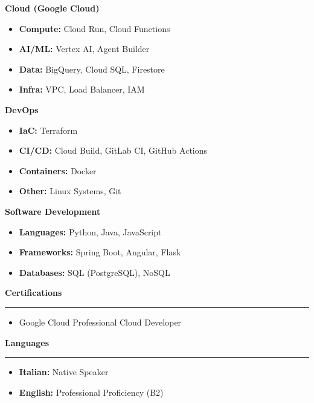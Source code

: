 \documentclass[10pt, a4paper]{article}
\newcommand{\cvsection}[1]{%
  \vspace{8pt} %
  \par %
  {\Large\bfseries\color{sectionblue}#1} %
  \par %
  \vspace{2pt} %
  \hrule %
  \vspace{6pt} %
}
\begin{document}
\begin{minipage}[t]{0.28\textwidth}
{\bfseries Cloud (Google Cloud)}
\begin{itemize}[leftmargin=*, nosep, itemsep=2pt]
    \item \textbf{Compute:} Cloud Run, Cloud Functions
    \item \textbf{AI/ML:} Vertex AI, Agent Builder
    \item \textbf{Data:} BigQuery, Cloud SQL, Firestore
    \item \textbf{Infra:} VPC, Load Balancer, IAM
\end{itemize}
\vspace{4pt}

{\bfseries DevOps}
\begin{itemize}[leftmargin=*, nosep, itemsep=2pt]
    \item \textbf{IaC:} Terraform
    \item \textbf{CI/CD:} Cloud Build, GitLab CI, GitHub Actions
    \item \textbf{Containers:} Docker
    \item \textbf{Other:} Linux Systems, Git
\end{itemize}
\vspace{4pt}

{\bfseries Software Development}
\begin{itemize}[leftmargin=*, nosep, itemsep=2pt]
    \item \textbf{Languages:} Python, Java, JavaScript
    \item \textbf{Frameworks:} Spring Boot, Angular, Flask
    \item \textbf{Databases:} SQL (PostgreSQL), NoSQL
\end{itemize}
\vspace{4pt}


\cvsection{Certifications}

\begin{itemize}[leftmargin=*, nosep, itemsep=2pt]
    \item Google Cloud Professional Cloud Developer
\end{itemize}

\cvsection{Languages}

\begin{itemize}[leftmargin=*, nosep, itemsep=2pt]
    \item \textbf{Italian:} Native Speaker
    \item \textbf{English:} Professional Proficiency (B2)
\end{itemize}

\end{minipage}

\end{document}
